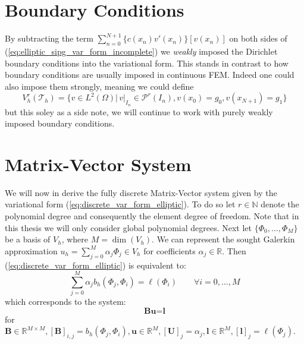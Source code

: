 \section{Boundary Conditions}
By subtracting the term $\sum_{n=0}^{N+1} \{c(x_n)v'(x_n)\}[v(x_n)]$ on both sides
of (\ref{eq:elliptic_sipg_var_form_incomplete}) we \textit{weakly} imposed the Dirichlet
boundary conditions into the variational form. This stands in contrast to how boundary 
conditions are usually imposed in continuous FEM. Indeed one could also impose them strongly,
meaning we could define 
\begin{equation*}
    V_h^r(\mathcal{T}_h) = \{v \in L^2(\Omega) |\, v|_{I_n} \in \mathcal{P}^r(I_n), v(x_0)=g_0, v(x_{N+1})=g_1 \}
\end{equation*}
but this soley as a side note, we will continue to work with purely weakly imposed 
boundary conditions.  

\section{Matrix-Vector System}
We will now in derive the fully discrete Matrix-Vector system given by
the variational form (\ref{eq:discrete_var_form_elliptic}). To do so let
$r \in \mathbb{N}$ denote the polynomial degree and consequently the element degree of freedom. Note that in this thesis we will only consider global polynomial degrees.
Next let $\{\Phi_0,\ldots,\Phi_M\}$ be a basis of $V_h$, where $M = \dim(V_h)$.
We can represent the sought Galerkin approximation $u_h = \sum_{j=0}^{M} \alpha_j \Phi_j\in V_h$ for coefficients 
$\alpha_j \in \mathbb{R}$. Then (\ref{eq:discrete_var_form_elliptic}) is equivalent to:
\begin{equation*}
    \sum_{j=0}^{M} \alpha_j b_h(\Phi_j, \Phi_i) = \ell(\Phi_i) \qquad \forall i=0,\ldots,M
\end{equation*}
which corresponds to the system:
\begin{equation}
    \label{eq:fully_discrete_dg_system_elliptic}
    \textbf{Bu} = \textbf{l}
\end{equation}
for $ \textbf{B} \in \mathbb{R}^{M\times M}, [\textbf{B}]_{i,j} = b_h(\Phi_j, \Phi_i), 
\textbf{u} \in \mathbb{R}^M, [\textbf{U}]_j = \alpha_j, 
\textbf{l}\in\mathbb{R}^M, [\textbf{l}]_j = \ell(\Phi_j)$.

